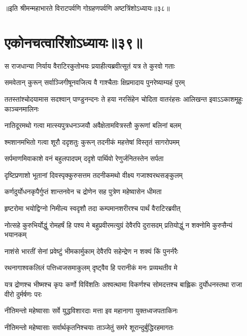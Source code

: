 ॥इति श्रीमन्महाभारते विराटपर्वणि गोग्रहणपर्वणि अष्टत्रिंशोऽध्यायः॥३८॥

\chapter{एकोनचत्वारिंशोऽध्यायः॥३९॥}

\twolineshloka
{स राजधान्या निर्याय वैराटिरकुतोभयः}
{प्रयाहीत्यब्रवीत्सूतं यत्र ते कुरवो गताः}


\twolineshloka
{समवेतान् कुरून् सर्वाञ्जिगीषूनवजित्य वै}
{गाश्चैताः क्षिप्रमादाय पुनरेष्याम्यहं पुरम्}


\onelineshloka
{ततस्तांश्चोदयामास सदश्वान् पाण्डुनन्दनः}
\twolineshloka
{ते हया नरसिंहेन चोदिता वातरंहसः}
{आलिखन्त इवाऽऽकाशमूहुः काञ्चनमालिनः}


\twolineshloka
{नातिदूरमथो गत्वा मात्स्यपुत्रधनञ्जयौ}
{अवैक्षेतामवित्रस्तौ कुरूणां बलिनां बलम्}


\twolineshloka
{श्मशानमभितो गत्वा शूरौ ददृशतुः कुरून्}
{तदनीकं महत्तेषां विस्तृतं सागरोपमम्}


\twolineshloka
{सर्पमाणमिवाकाशे वनं बहुलपादपम्}
{ददृशे पार्थिवो रेणुर्जनितस्तेन सर्पता}


\twolineshloka
{दृष्टिप्रणाशो भूतानां दिवस्पृक्कुरुसत्तम}
{तदनीकमथो वीक्ष्य गजाश्वरथसङ्कुलम्}


\twolineshloka
{कर्णदुर्योधनकृपैर्गुप्तं शान्तनवेन च}
{द्रोणेन सह पुत्रेण महेष्वासेन धीमता}


\twolineshloka
{हृष्टरोमा भयोद्विग्नो निमील्य स्वदृशौ तदा}
{कम्पमानशरीरश्च पार्थं वैराटिरब्रवीत्}


\threelineshloka
{नोत्सहे कुरुभिर्योद्धुं रोमहर्षं हि पश्य मे}
{बहुप्रवीरमत्युग्रं देवैरपि दुरासदम्}
{प्रतियोद्धुं न शक्नोमि कुरुसैन्यं भयानकम्}


\twolineshloka
{नाशंसे भारतीं सेनां प्रवेष्टुं भीमकार्मुकाम्}
{देवैरपि सहेन्द्रेण न शक्यं किं पुनर्नरैः}


\twolineshloka
{रथनागाश्वकलिलं पत्तिध्वजसमाकुलम्}
{दृष्ट्वैव हि परानीकं मनः प्रव्यथतीव मे}


\threelineshloka
{यत्र द्रोणश्च भीष्मश्च कृपः कर्णो विविंशतिः}
{अश्वत्थामा विकर्णश्च सोमदत्तश्च बाह्लिकः}
{दुर्योधनस्तथा राजा वीरो दुर्मर्षणः परः}


\twolineshloka
{नीतिमन्तो महेष्वासाः सर्वे युद्धविशारदाः}
{मत्ता इव महानागा युक्तध्वजपताकिनः}


\twolineshloka
{नीतिमन्तो महेष्वासाः सर्वार्थकृतनिश्चयाः}
{ताञ्जेतुं समरे शूरान्दुर्बुद्धिरहमागतः}


